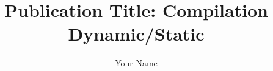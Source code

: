 \documentclass{latex_styles/quantum/quantumarticle}
\begin{document}
\title{Publication Title: Compilation Dynamic/Static}
\author{Your Name}

\maketitle





\end{document}
